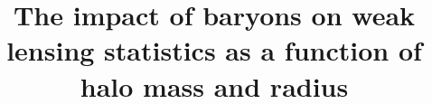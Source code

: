 \documentclass[linenumbers,trackchanges]{aastex701}
\begin{document}
\title{The impact of baryons on weak lensing statistics as a function of halo mass and radius}

\end{document}
